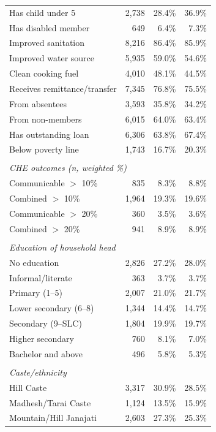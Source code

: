 \begin{table}[htbp]
\begin{tabular}{lrrr}
\quad Has child under 5 & 2,738 & 28.4\% & 36.9\% \\
\quad Has disabled member & 649 & 6.4\% & 7.3\% \\
\quad Improved sanitation & 8,216 & 86.4\% & 85.9\% \\
\quad Improved water source & 5,935 & 59.0\% & 54.6\% \\
\quad Clean cooking fuel & 4,010 & 48.1\% & 44.5\% \\
\quad Receives remittance/transfer & 7,345 & 76.8\% & 75.5\% \\
\quad \quad From absentees & 3,593 & 35.8\% & 34.2\% \\
\quad \quad From non-members & 6,015 & 64.0\% & 63.4\% \\
\quad Has outstanding loan & 6,306 & 63.8\% & 67.4\% \\
\quad Below poverty line & 1,743 & 16.7\% & 20.3\% \\
\\
\multicolumn{4}{l}{\textit{CHE outcomes (n, weighted \%)}} \\
\quad Communicable $>$ 10\% & 835 & 8.3\% & 8.8\% \\
\quad Combined $>$ 10\% & 1,964 & 19.3\% & 19.6\% \\
\quad Communicable $>$ 20\% & 360 & 3.5\% & 3.6\% \\
\quad Combined $>$ 20\% & 941 & 8.9\% & 8.9\% \\
\\
\multicolumn{4}{l}{\textit{Education of household head}} \\
\quad No education & 2,826 & 27.2\% & 28.0\% \\
\quad Informal/literate & 363 & 3.7\% & 3.7\% \\
\quad Primary (1--5) & 2,007 & 21.0\% & 21.7\% \\
\quad Lower secondary (6--8) & 1,344 & 14.4\% & 14.7\% \\
\quad Secondary (9--SLC) & 1,804 & 19.9\% & 19.7\% \\
\quad Higher secondary & 760 & 8.1\% & 7.0\% \\
\quad Bachelor and above & 496 & 5.8\% & 5.3\% \\
\\
\multicolumn{4}{l}{\textit{Caste/ethnicity}} \\
\quad Hill Caste & 3,317 & 30.9\% & 28.5\% \\
\quad Madhesh/Tarai Caste & 1,124 & 13.5\% & 15.9\% \\
\quad Mountain/Hill Janajati & 2,603 & 27.3\% & 25.3\% \\

\end{tabular}
\end{table}
